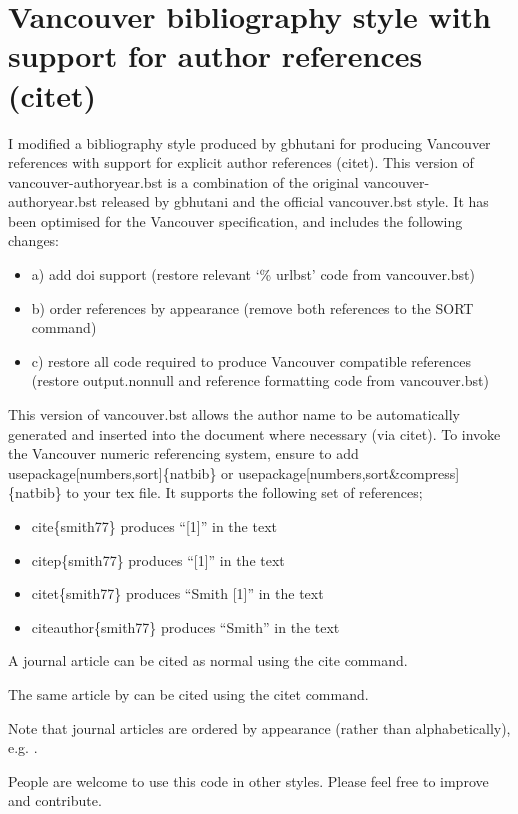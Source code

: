 \documentclass[a4paper,12pt,twoside]{report}
\begin{document}
\chapter*{Vancouver bibliography style with support for author references (citet)}

I modified a bibliography style produced by gbhutani for producing Vancouver references with support for explicit author references (citet). This version of vancouver-authoryear.bst is a combination of the original vancouver-authoryear.bst released by gbhutani and the official vancouver.bst style. It has been optimised for the Vancouver specification, and includes the following changes: 

\begin{itemize}
\item a) add doi support (restore relevant `\% urlbst' code from vancouver.bst)
\item b) order references by appearance (remove both references to the SORT command)
\item c) restore all code required to produce Vancouver compatible references (restore output.nonnull and reference formatting code from vancouver.bst)
\end{itemize}

This version of vancouver.bst allows the author name to be automatically generated and inserted into the document where necessary (via citet). To invoke the Vancouver numeric referencing system, ensure to add usepackage[numbers,sort]\{natbib\} or usepackage[numbers,sort&compress]\{natbib\} to your tex file. It supports the following set of references;

\begin{itemize}
\item cite\{smith77\} produces ``[1]'' in the text
\item citep\{smith77\} produces ``[1]'' in the text
\item citet\{smith77\} produces ``Smith [1]'' in the text
\item citeauthor\{smith77\} produces ``Smith'' in the text
\end{itemize}

A journal article \cite{ramkrishna2000population} can be cited as normal using the cite command.

The same article by \citet{ramkrishna2000population} can be cited using the citet command.

Note that journal articles are ordered by appearance (rather than alphabetically), e.g. \cite{bhutani2013determination}.

People are welcome to use this code in other styles. Please feel free to improve and contribute.



\end{document}
